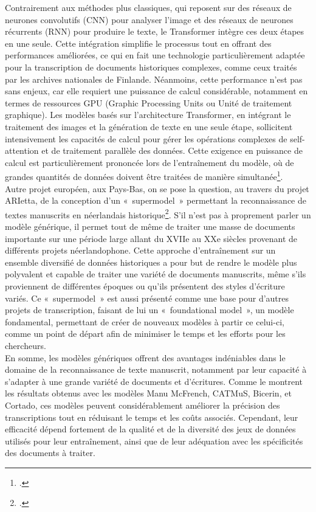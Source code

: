 \documentclass[a4paper,12pt,twoside]{book}
\begin{document}
	Contrairement aux méthodes plus classiques, qui reposent sur des réseaux de neurones convolutifs (CNN) pour analyser l’image et des réseaux de neurones récurrents (RNN) pour produire le texte, le Transformer intègre ces deux étapes en une seule. Cette intégration simplifie le processus tout en offrant des performances améliorées, ce qui en fait une technologie particulièrement adaptée pour la transcription de documents historiques complexes, comme ceux traités par les archives nationales de Finlande. Néanmoins, cette performance n’est pas sans enjeux, car elle requiert une puissance de calcul considérable, notamment en termes de ressources GPU (Graphic Processing Units ou Unité de traitement graphique). Les modèles basés sur l’architecture Transformer, en intégrant le traitement des images et la génération de texte en une seule étape, sollicitent intensivement les capacités de calcul pour gérer les opérations complexes de self-attention et de traitement parallèle des données. Cette exigence en puissance de calcul est particulièrement prononcée lors de l’entraînement du modèle, où de grandes quantités de données doivent être traitées de manière simultanée\footcite{li_trocr_2023}.
	\\
	
	Autre projet européen, aux Pays-Bas, on se pose la question, au travers du projet ARIetta, de la conception d’un « supermodel » permettant la reconnaissance de textes manuscrits en néerlandais historique\footcite{lefranc_arletta_2024}. S’il n’est pas à proprement parler un modèle générique, il permet tout de même de traiter une masse de documents importante sur une période large allant du XVIIe au XXe siècles provenant de différents projets néerlandophone. Cette approche d’entraînement sur un ensemble diversifié de données historiques a pour but de rendre le modèle plus polyvalent et capable de traiter une variété de documents manuscrits, même s’ils proviennent de différentes époques ou qu’ils présentent des styles d’écriture variés. Ce « supermodel » est aussi présenté comme une base pour d’autres projets de transcription, faisant de lui un « foundational model », un modèle fondamental, permettant de créer de nouveaux modèles à partir ce celui-ci, comme un point de départ afin de minimiser le temps et les efforts pour les chercheurs.  
	\\
	
	En somme, les modèles génériques offrent des avantages indéniables dans le domaine de la reconnaissance de texte manuscrit, notamment par leur capacité à s’adapter à une grande variété de documents et d’écritures. Comme le montrent les résultats obtenus avec les modèles Manu McFrench, CATMuS, Bicerin, et Cortado, ces modèles peuvent considérablement améliorer la précision des transcriptions tout en réduisant le temps et les coûts associés. Cependant, leur efficacité dépend fortement de la qualité et de la diversité des jeux de données utilisés pour leur entraînement, ainsi que de leur adéquation avec les spécificités des documents à traiter.
	
\end{document}
